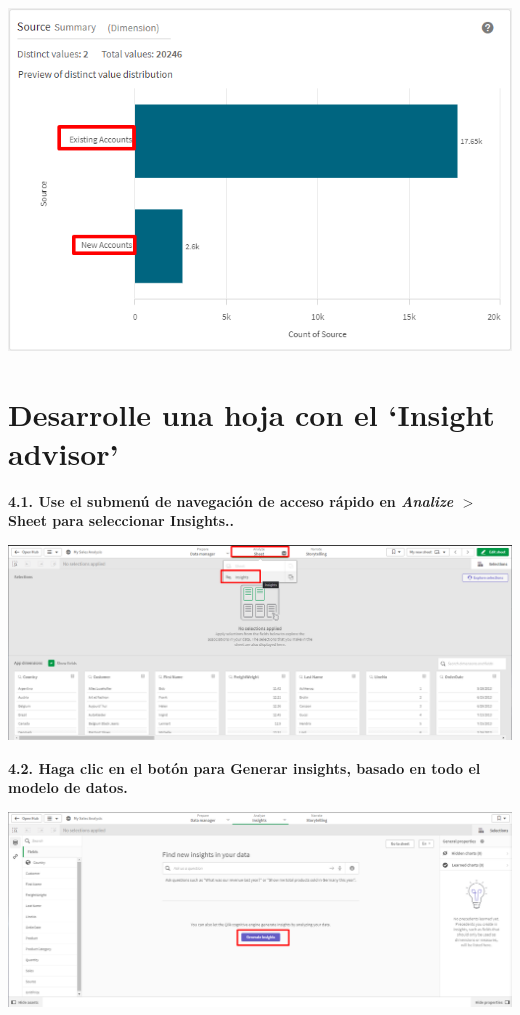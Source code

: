 \documentclass{article}
\begin{document}
    \begin{center}
		\includegraphics[width=14cm]{./images/6.5} 
	\end{center}



\section{Desarrolle una hoja con el ‘Insight advisor’}

\textbf{4.1. Use el submenú de navegación de acceso
 rápido en \textit{Analize} $>$ \textbf{Sheet} para seleccionar \textbf{Insights}..}

    \begin{center}
		\includegraphics[width=14cm]{./images/7} 
	\end{center}

\textbf{4.2. Haga clic en el botón
 para \textbf{Generar insights}, basado en todo el modelo de datos.}

    \begin{center}
		\includegraphics[width=14cm]{./images/8} 
	\end{center}
	
\end{document}
